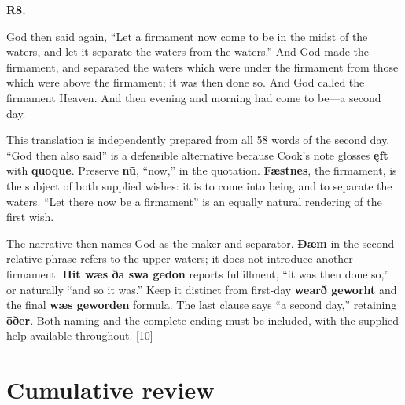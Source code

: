 \par\begin{minipage}{\linewidth}\raggedright
\textbf{R8.}

God then said again, “Let a firmament now come to be in the midst of the waters, and let it separate the waters from the waters.” And God made the firmament, and separated the waters which were under the firmament from those which were above the firmament; it was then done so. And God called the firmament Heaven. And then evening and morning had come to be—a second day.

This translation is independently prepared from all 58 words of the second day. “God then also said” is a defensible alternative because Cook's note glosses \textbf{ęft} with \textbf{quoque}. Preserve \textbf{nū}, “now,” in the quotation. \textbf{Fæstnes}, the firmament, is the subject of both supplied wishes: it is to come into being and to separate the waters. “Let there now be a firmament” is an equally natural rendering of the first wish.

The narrative then names God as the maker and separator. \textbf{Ðǣm} in the second relative phrase refers to the upper waters; it does not introduce another firmament. \textbf{Hit wæs ðā swā gedōn} reports fulfillment, “it was then done so,” or naturally “and so it was.” Keep it distinct from first-day \textbf{wearð geworht} and the final \textbf{wæs geworden} formula. The last clause says “a second day,” retaining \textbf{ōðer}. Both naming and the complete ending must be included, with the supplied help available throughout. [10]

\end{minipage}\par\addvspace{4pt}

\clearpage
\section*{Cumulative review}

